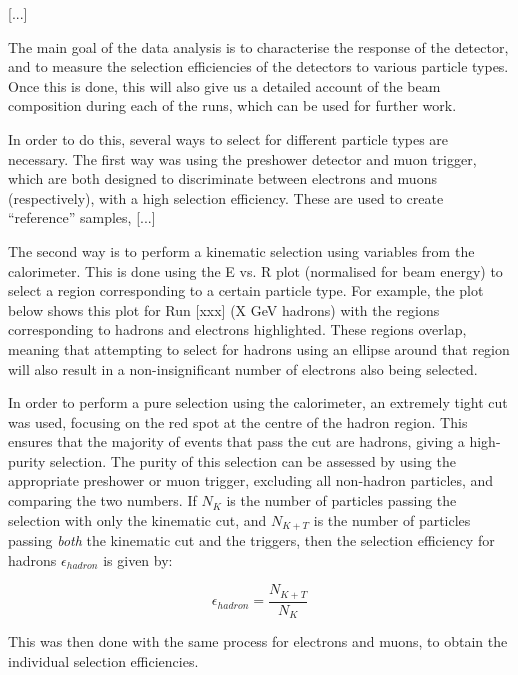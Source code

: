 [...]

The main goal of the data analysis is to characterise the response of the detector, and to measure the selection efficiencies of the detectors to various particle types. Once this is done, this will also give us a detailed account of the beam composition during each of the runs, which can be used for further work.

In order to do this, several ways to select for different particle types are necessary. The first way was using the preshower detector and muon trigger, which are both designed to discriminate between electrons and muons (respectively), with a high selection efficiency. These are used to create ``reference'' samples, [...]

The second way is to perform a kinematic selection using variables from the calorimeter. This is done using the E vs. R plot (normalised for beam energy) to select a region corresponding to a certain particle type. For example, the plot below shows this plot for Run [xxx] (X GeV hadrons) with the regions corresponding to hadrons and electrons highlighted. These regions overlap, meaning that attempting to select for hadrons using an ellipse around that region will also result in a non-insignificant number of electrons also being selected.

In order to perform a pure selection using the calorimeter, an extremely tight cut was used, focusing on the red spot at the centre of the hadron region. This ensures that the majority of events that pass the cut are hadrons, giving a high-purity selection. The purity of this selection can be assessed by using the appropriate preshower or muon trigger, excluding all non-hadron particles, and comparing the two numbers. If $N_{K}$ is the number of particles passing the selection with only the kinematic cut, and $N_{K+T}$ is the number of particles passing \emph{both} the kinematic cut and the triggers, then the selection efficiency for hadrons $\epsilon_{hadron}$ is given by:

\begin{displaymath}
	\epsilon_{hadron} = \frac{N_{K+T}}{N_{K}}
\end{displaymath}

This was then done with the same process for electrons and muons, to obtain the individual selection efficiencies. %

